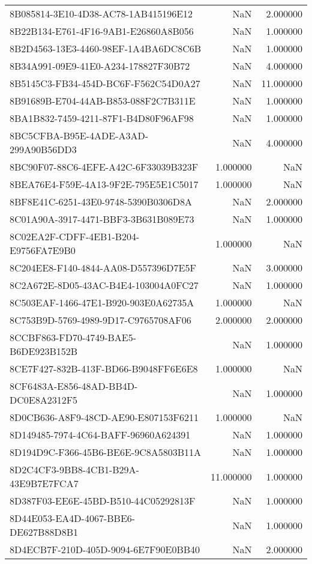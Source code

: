 \begin{tabular}{lrr}
8B085814-3E10-4D38-AC78-1AB415196E12 & NaN & 2.000000 \\
8B22B134-E761-4F16-9AB1-E26860A8B056 & NaN & 1.000000 \\
8B2D4563-13E3-4460-98EF-1A4BA6DC8C6B & NaN & 1.000000 \\
8B34A991-09E9-41E0-A234-178827F30B72 & NaN & 4.000000 \\
8B5145C3-FB34-454D-BC6F-F562C54D0A27 & NaN & 11.000000 \\
8B91689B-E704-44AB-B853-088F2C7B311E & NaN & 1.000000 \\
8BA1B832-7459-4211-87F1-B4D80F96AF98 & NaN & 1.000000 \\
8BC5CFBA-B95E-4ADE-A3AD-299A90B56DD3 & NaN & 4.000000 \\
8BC90F07-88C6-4EFE-A42C-6F33039B323F & 1.000000 & NaN \\
8BEA76E4-F59E-4A13-9F2E-795E5E1C5017 & 1.000000 & NaN \\
8BF8E41C-6251-43E0-9748-5390B0306D8A & NaN & 2.000000 \\
8C01A90A-3917-4471-BBF3-3B631B089E73 & NaN & 1.000000 \\
8C02EA2F-CDFF-4EB1-B204-E9756FA7E9B0 & 1.000000 & NaN \\
8C204EE8-F140-4844-AA08-D557396D7E5F & NaN & 3.000000 \\
8C2A672E-8D05-43AC-B4E4-103004A0FC27 & NaN & 1.000000 \\
8C503EAF-1466-47E1-B920-903E0A62735A & 1.000000 & NaN \\
8C753B9D-5769-4989-9D17-C9765708AF06 & 2.000000 & 2.000000 \\
8CCBF863-FD70-4749-BAE5-B6DE923B152B & NaN & 1.000000 \\
8CE7F427-832B-413F-BD66-B9048FF6E6E8 & 1.000000 & NaN \\
8CF6483A-E856-48AD-BB4D-DC0E8A2312F5 & NaN & 1.000000 \\
8D0CB636-A8F9-48CD-AE90-E807153F6211 & 1.000000 & NaN \\
8D149485-7974-4C64-BAFF-96960A624391 & NaN & 1.000000 \\
8D194D9C-F366-45B6-BE6E-9C8A5803B11A & NaN & 1.000000 \\
8D2C4CF3-9BB8-4CB1-B29A-43E9B7E7FCA7 & 11.000000 & 1.000000 \\
8D387F03-EE6E-45BD-B510-44C05292813F & NaN & 1.000000 \\
8D44E053-EA4D-4067-BBE6-DE627B88D8B1 & NaN & 1.000000 \\
8D4ECB7F-210D-405D-9094-6E7F90E0BB40 & NaN & 2.000000 \\

\end{tabular}
